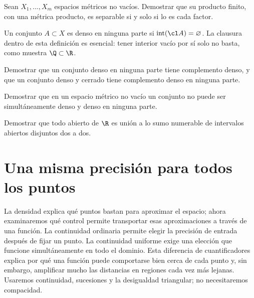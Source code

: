\begin{ejercicio}\label{ej:lectura-6-5}
Sean $X_1,\ldots,X_m$ espacios métricos no vacíos. Demostrar que su producto finito, con una métrica producto, es separable si y solo si lo es cada factor.
\end{ejercicio}


\begin{definicion}
Un conjunto $A\subset X$ es denso en ninguna parte si $\operatorname{int}(\cl A)=\varnothing$. La clausura dentro de esta definición es esencial: tener interior vacío por sí solo no basta, como muestra $\Q\subset\R$.
\end{definicion}

\begin{ejercicio}\label{ej:lectura-6-6}
Demostrar que un conjunto denso en ninguna parte tiene complemento denso, y que un conjunto denso y cerrado tiene complemento denso en ninguna parte.
\end{ejercicio}


\begin{ejercicio}\label{ej:lectura-6-7}
Demostrar que en un espacio métrico no vacío un conjunto no puede ser simultáneamente denso y denso en ninguna parte.
\end{ejercicio}


\begin{ejercicio}\label{ej:lectura-6-8}\label{ch06:intervalos}
Demostrar que todo abierto de $\R$ es unión a lo sumo numerable de intervalos abiertos disjuntos dos a dos.
\end{ejercicio}


\section{Una misma precisión para todos los puntos}\label{lectura:07}
La densidad explica qué puntos bastan para aproximar el espacio; ahora examinaremos qué control permite transportar esas aproximaciones a través de una función. La continuidad ordinaria permite elegir la precisión de entrada después de fijar un punto. La continuidad uniforme exige una elección que funcione simultáneamente en todo el dominio. Esta diferencia de cuantificadores explica por qué una función puede comportarse bien cerca de cada punto y, sin embargo, amplificar mucho las distancias en regiones cada vez más lejanas. Usaremos continuidad, sucesiones y la desigualdad triangular; no necesitaremos compacidad.

